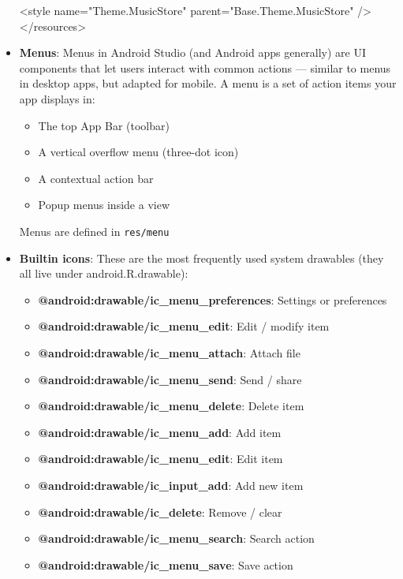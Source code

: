 \documentclass{report}
\begin{document}
\begin{itemize}
\begin{javacode}
                    <style name="Theme.MusicStore" parent="Base.Theme.MusicStore" />
                </resources>
            \end{javacode}
        \item \textbf{Menus}: Menus in Android Studio (and Android apps generally) are UI components that let users interact with common actions — similar to menus in desktop apps, but adapted for mobile.
            \bigbreak \noindent 
            A menu is a set of action items your app displays in:
            \begin{itemize}
                \item The top App Bar (toolbar)
                \item A vertical overflow menu (three-dot icon)
                \item A contextual action bar
                \item Popup menus inside a view
            \end{itemize}
            Menus are defined in \texttt{res/menu}
        \item \textbf{Builtin icons}: These are the most frequently used system drawables (they all live under android.R.drawable):
            \begin{itemize}
                \item \textbf{@android:drawable/ic\_menu\_preferences}:	Settings or preferences 
                \item \textbf{@android:drawable/ic\_menu\_edit}:	Edit / modify item 
                \item \textbf{@android:drawable/ic\_menu\_attach}:	Attach file 
                \item \textbf{@android:drawable/ic\_menu\_send}:	Send / share 
                \item \textbf{@android:drawable/ic\_menu\_delete}:	Delete item 
                \item \textbf{@android:drawable/ic\_menu\_add}:	    Add item 
                \item \textbf{@android:drawable/ic\_menu\_edit}:	Edit item 
                \item \textbf{@android:drawable/ic\_input\_add}:	Add new item 
                \item \textbf{@android:drawable/ic\_delete}:	Remove / clear 
                \item \textbf{@android:drawable/ic\_menu\_search}:	Search action 
                \item \textbf{@android:drawable/ic\_menu\_save}:	Save action 

\end{itemize}
\end{itemize}
\end{document}
